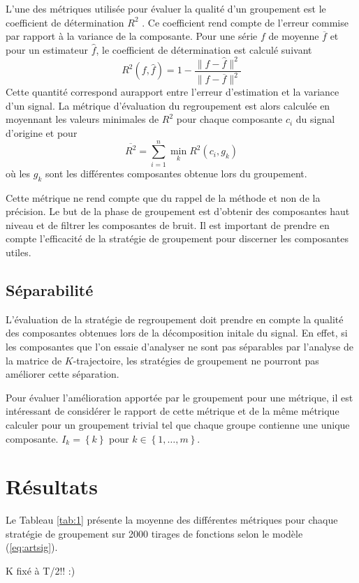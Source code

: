 \documentclass{gretsi}
\newcommand{\set}[1]{\left \{ 1, \dots, #1 \right \}}
\begin{document}
    L'une des métriques utilisée pour évaluer la qualité d'un groupement est le coefficient de détermination $R^2$ \cite{abalov_14_auto}. Ce coefficient rend compte de l'erreur commise par rapport à la variance de la composante. Pour une série $f$ de moyenne $\overline f$ et pour un estimateur $\widehat f$, le coefficient de détermination est calculé suivant
    $$
        R^2(f, \widehat f) = 1 - \frac{\|f-\widehat f\|^2}{\|f-\overline f\|^2}
    $$Cette quantité correspond aurapport entre l'erreur d'estimation et la variance d'un signal. La métrique d'évaluation du regroupement est alors calculée en moyennant les valeurs minimales de $R^2$ pour chaque composante $c_i$ du signal d'origine et pour 
    $$
        \overline{ R^2} = \sum_{i=1}^n \min_k R^2(c_i, g_k)
    $$où les $g_k$ sont les différentes composantes obtenue lors du groupement.
    
    Cette métrique ne rend compte que du rappel de la méthode et non de la précision. Le but de la phase de groupement est d'obtenir des composantes haut niveau et de filtrer les composantes de bruit. Il est important de prendre en compte l'efficacité de la stratégie de groupement pour discerner les composantes utiles.


\subsection{Séparabilité}
\label{sub:sep}
    L'évaluation de la stratégie de regroupement doit prendre en compte la qualité des composantes obtenues lors de la décomposition initale du signal. En effet, si les composantes que l'on essaie d'analyser ne sont pas séparables par l'analyse de la matrice de $K$-trajectoire, les stratégies de groupement ne pourront pas améliorer cette séparation.
    
       
   Pour évaluer l'amélioration apportée par le groupement pour une métrique, il est intéressant de considérer le rapport de cette métrique et de la même métrique calculer pour un groupement trivial tel que chaque groupe contienne une unique composante. $I_k = \left \{ k \right \}$ pour $k \in \set{m}$.

\section{Résultats}
\label{sec:res}
Le Tableau \ref{tab:1} présente la moyenne des différentes métriques pour chaque stratégie de groupement sur 2000 tirages de fonctions selon le modèle (\ref{eq:artsig}).

K fixé à T/2!! :)

 
{}
\end{document}

